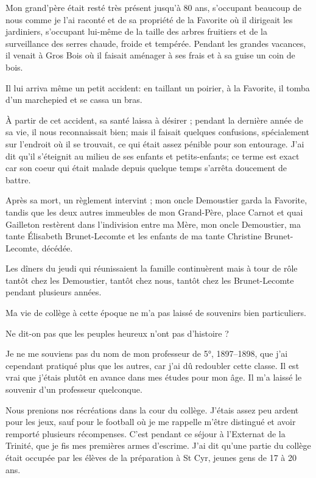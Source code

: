 \documentclass[11pt,a4paper]{report}
\begin{document}
Mon grand'père était resté très présent jusqu'à 80 ans, s'occupant beaucoup de nous comme je l'ai raconté et de sa propriété de la Favorite où il dirigeait les jardiniers, s'occupant lui-même de la taille des arbres fruitiers et de la surveillance des serres chaude, froide et tempérée. Pendant les grandes vacances, il venait à Gros Bois où il faisait aménager à ses frais et à sa guise un coin de bois.

Il lui arriva même un petit accident: en taillant un poirier, à la Favorite, il tomba d'un marchepied et se cassa un bras.

À partir de cet accident, sa santé laissa à désirer ; pendant la dernière année de sa vie, il nous reconnaissait bien; mais il faisait quelques confusions, spécialement sur l'endroit où il se trouvait, ce qui était assez pénible pour son entourage. J'ai dit qu'il s'éteignit au milieu de ses enfants et petits-enfants; ce terme est exact car son coeur qui était malade depuis quelque temps s'arrêta doucement de battre.

Après sa mort, un règlement intervint ; mon oncle Demoustier garda la Favorite, tandis que les deux autres immeubles de mon Grand-Père, place Carnot et quai Gailleton restèrent dans l'indivision entre ma Mère, mon oncle Demoustier, ma tante Élisabeth Brunet-Lecomte et les enfants de ma tante Christine Brunet-Lecomte, décédée.

Les dîners du jeudi qui réunissaient la famille continuèrent mais à tour de rôle tantôt chez les Demoustier, tantôt chez nous, tantôt chez les Brunet-Lecomte pendant plusieurs années.

Ma vie de collège à cette époque ne m'a pas laissé de souvenirs bien particuliers.

Ne dit-on pas que les peuples heureux n'ont pas d'histoire ?

Je ne me souviens pas du nom de mon professeur de 5°, 1897--1898, que j'ai cependant pratiqué plus que les autres, car j'ai dû redoubler cette classe. Il est vrai que j'étais plutôt en avance dans mes études pour mon âge. Il m'a laissé le souvenir d'un professeur quelconque.

Nous prenions nos récréations dans la cour du collège. J'étais assez peu ardent pour les jeux, sauf pour le football où je me rappelle m'être distingué et avoir remporté plusieurs récompenses. C'est pendant ce séjour à l'Externat de la Trinité, que je fis mes premières armes d'escrime. J'ai dit qu'une partie du collège était occupée par les élèves de la préparation à St Cyr, jeunes gens de 17 à 20 ans.
\end{document}
